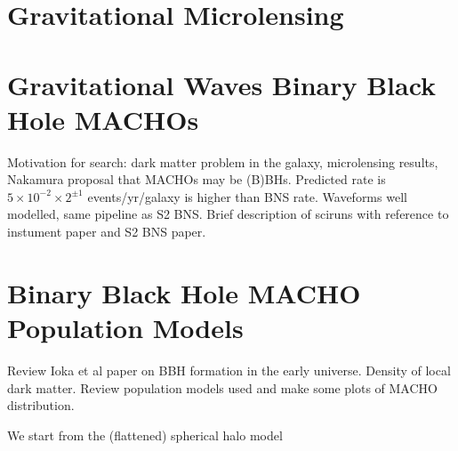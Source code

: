 \section{Gravitational Microlensing}

\section{Gravitational Waves Binary Black Hole MACHOs}

Motivation for search: dark matter problem in the galaxy, microlensing
results, Nakamura proposal that MACHOs may be (B)BHs. Predicted rate is
$5\times10^{-2}\times2^{\pm 1}$ events/yr/galaxy is higher than BNS rate.
Waveforms well modelled, same pipeline as S2 BNS. Brief description of sciruns
with reference to instument paper and S2 BNS paper.

\section{Binary Black Hole MACHO Population Models}

Review Ioka et al paper on BBH formation in the early universe. Density of
local dark matter. Review population models used and make some plots of MACHO
distribution.

We start from the (flattened) spherical halo model
